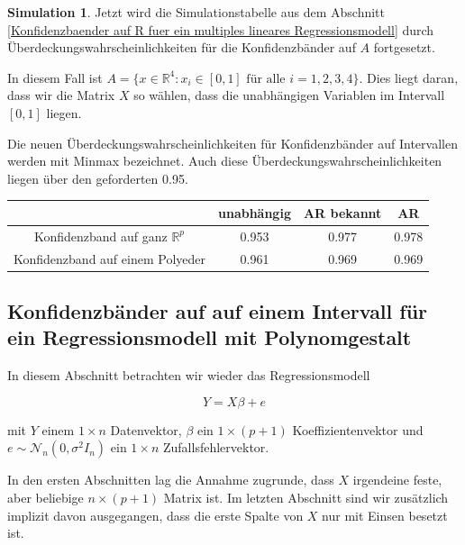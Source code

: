 \documentclass[12pt,a4paper]{article}
\theoremstyle{definition}
\theoremstyle{definition}
\theoremstyle{definition}
\newtheorem{Simulation}[Definition]{Simulation}
\theoremstyle{definition}
\newcommand{\UeberRR}{0.953}
\newcommand{\UeberRMinmax}{0.961}
\newcommand{\UeberARbekanntR}{0.977}
\newcommand{\UeberARbekanntMinmax}{0.969}
\newcommand{\UeberARR}{0.978}
\newcommand{\UeberARMinmax}{0.969}
\begin{document}
\begin{Simulation}
Jetzt wird die Simulationstabelle aus dem Abschnitt \ref{Konfidenzbaender auf R fuer ein multiples lineares Regressionsmodell} durch Überdeckungswahrscheinlichkeiten für die Konfidenzbänder auf $A$ fortgesetzt. 

In diesem Fall ist $A = \{x \in \mathbb{R}^4 : x_i \in [0,1] \text{ für alle } i=1, 2, 3, 4 \}$. Dies liegt daran, dass wir die Matrix $X$ so wählen, dass die unabhängigen Variablen im Intervall $[0,1]$ liegen.

Die neuen Überdeckungswahrscheinlichkeiten für Konfidenzbänder auf Intervallen werden mit Minmax bezeichnet. Auch diese Überdeckungswahrscheinlichkeiten liegen über den geforderten 0.95.

\begin{center}
\begin{tabular}{|c|c|c|c|}
\hline 
 & unabhängig & AR bekannt & AR \\ 
\hline 
Konfidenzband auf ganz $\mathbb{R}^{p}$		 & \UeberRR		  & \UeberARbekanntR & \UeberARR \\ 
\hline 
Konfidenzband auf einem Polyeder	 & \UeberRMinmax  & \UeberARbekanntMinmax & \UeberARMinmax \\ 
\hline 
\end{tabular} 
\end{center}

\end{Simulation}


\newpage
\subsection{Konfidenzbänder auf auf einem Intervall für ein Regressionsmodell mit Polynomgestalt}
\label{Konfidenzbaenderauf auf einem Intervall für Regressionsmodell mit Polynomgestalt}
In diesem Abschnitt betrachten wir wieder das Regressionsmodell 

\begin{equation*}
Y=X\beta+e
\end{equation*}

mit $Y$ einem $1 \times n$ Datenvektor, $\beta$ ein $1 \times (p+1)$ Koeffizientenvektor und $e \sim \mathscr{N}_{n}(0,\sigma^2 I_n )$ ein $1 \times n$ Zufallsfehlervektor.

In den ersten Abschnitten lag die Annahme zugrunde, dass $X$ irgendeine feste, aber beliebige $n \times (p+1)$ Matrix ist. Im letzten Abschnitt sind wir zusätzlich implizit davon ausgegangen, dass die erste Spalte von $X$ nur mit Einsen besetzt ist.
\end{document}
